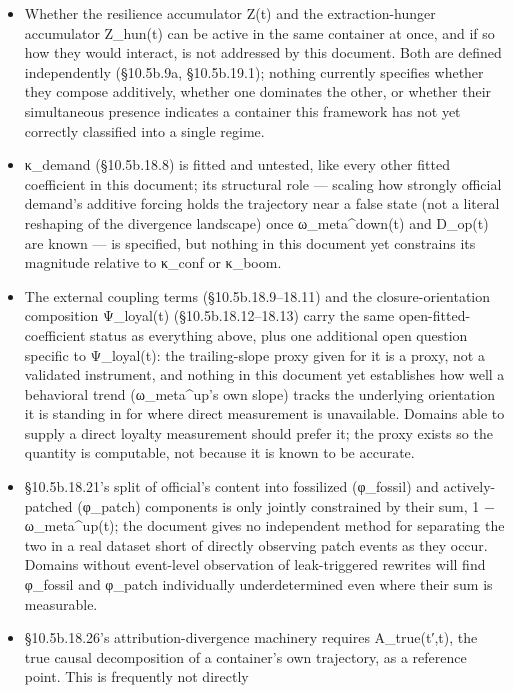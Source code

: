 \documentclass[
]{article}
\begin{document}
\begin{itemize}
  fitted coefficient in Part 15's reference table, await domain-specific
  data.
\item
  Whether the resilience accumulator Z(t) and the extraction-hunger
  accumulator Z\_hun(t) can be active in the same container at once, and
  if so how they would interact, is not addressed by this document. Both
  are defined independently (§10.5b.9a, §10.5b.19.1); nothing currently
  specifies whether they compose additively, whether one dominates the
  other, or whether their simultaneous presence indicates a container
  this framework has not yet correctly classified into a single regime.
\item
  κ\_demand (§10.5b.18.8) is fitted and untested, like every other
  fitted coefficient in this document; its structural role --- scaling
  how strongly official demand's additive forcing holds the trajectory
  near a false state (not a literal reshaping of the divergence
  landscape) once ω\_meta\^{}down(t) and D\_op(t) are known --- is
  specified, but nothing in this document yet constrains its magnitude
  relative to κ\_conf or κ\_boom.
\item
  The external coupling terms (§10.5b.18.9--18.11) and the
  closure-orientation composition Ψ\_loyal(t) (§10.5b.18.12--18.13)
  carry the same open-fitted-coefficient status as everything above,
  plus one additional open question specific to Ψ\_loyal(t): the
  trailing-slope proxy given for it is a proxy, not a validated
  instrument, and nothing in this document yet establishes how well a
  behavioral trend (ω\_meta\^{}up's own slope) tracks the underlying
  orientation it is standing in for where direct measurement is
  unavailable. Domains able to supply a direct loyalty measurement
  should prefer it; the proxy exists so the quantity is computable, not
  because it is known to be accurate.
\item
  §10.5b.18.21's split of official's content into fossilized (φ\_fossil)
  and actively-patched (φ\_patch) components is only jointly constrained
  by their sum, 1 − ω\_meta\^{}up(t); the document gives no independent
  method for separating the two in a real dataset short of directly
  observing patch events as they occur. Domains without event-level
  observation of leak-triggered rewrites will find φ\_fossil and
  φ\_patch individually underdetermined even where their sum is
  measurable.
\item
  §10.5b.18.26's attribution-divergence machinery requires
  A\_true(t′,t), the true causal decomposition of a container's own
  trajectory, as a reference point. This is frequently not directly

\end{itemize}
\end{document}
